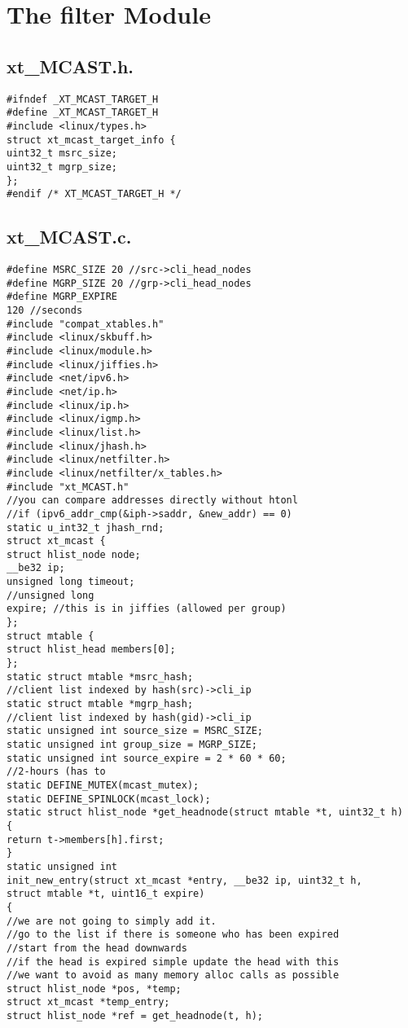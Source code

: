 \section{The filter Module}
\subsection{xt\_MCAST.h.}
\begin{verbatim}
#ifndef _XT_MCAST_TARGET_H
#define _XT_MCAST_TARGET_H
#include <linux/types.h>
struct xt_mcast_target_info {
uint32_t msrc_size;
uint32_t mgrp_size;
};
#endif /* XT_MCAST_TARGET_H */
\end{verbatim}
\subsection{xt\_MCAST.c.}
\begin{verbatim}
#define MSRC_SIZE 20 //src->cli_head_nodes
#define MGRP_SIZE 20 //grp->cli_head_nodes
#define MGRP_EXPIRE
120 //seconds
#include "compat_xtables.h"
#include <linux/skbuff.h>
#include <linux/module.h>
#include <linux/jiffies.h>
#include <net/ipv6.h>
#include <net/ip.h>
#include <linux/ip.h>
#include <linux/igmp.h>
#include <linux/list.h>
#include <linux/jhash.h>
#include <linux/netfilter.h>
#include <linux/netfilter/x_tables.h>
#include "xt_MCAST.h"
//you can compare addresses directly without htonl
//if (ipv6_addr_cmp(&iph->saddr, &new_addr) == 0)
static u_int32_t jhash_rnd;
struct xt_mcast {
struct hlist_node node;
__be32 ip;
unsigned long timeout;
//unsigned long
expire; //this is in jiffies (allowed per group)
};
struct mtable {
struct hlist_head members[0];
};
static struct mtable *msrc_hash;
//client list indexed by hash(src)->cli_ip
static struct mtable *mgrp_hash;
//client list indexed by hash(gid)->cli_ip
static unsigned int source_size = MSRC_SIZE;
static unsigned int group_size = MGRP_SIZE;
static unsigned int source_expire = 2 * 60 * 60;
//2-hours (has to
static DEFINE_MUTEX(mcast_mutex);
static DEFINE_SPINLOCK(mcast_lock);
static struct hlist_node *get_headnode(struct mtable *t, uint32_t h)
{
return t->members[h].first;
}
static unsigned int
init_new_entry(struct xt_mcast *entry, __be32 ip, uint32_t h,
struct mtable *t, uint16_t expire)
{
//we are not going to simply add it.
//go to the list if there is someone who has been expired
//start from the head downwards
//if the head is expired simple update the head with this
//we want to avoid as many memory alloc calls as possible
struct hlist_node *pos, *temp;
struct xt_mcast *temp_entry;
struct hlist_node *ref = get_headnode(t, h);

\end{verbatim}
